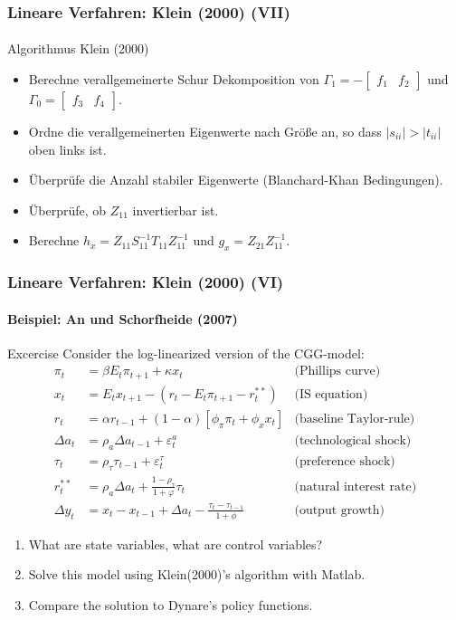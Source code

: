 \documentclass[10pt]{beamer}  %
\begin{document}
\begin{frame}
\frametitle{Lineare Verfahren: Klein (2000) (VII)}\framesubtitle{}
\begin{block}{Algorithmus Klein (2000)}
\begin{itemize}
  \item Berechne verallgemeinerte Schur Dekomposition von $\Gamma_1=-\begin{bmatrix} f_1 & f_2\end{bmatrix}$ und $\Gamma_0=\begin{bmatrix} f_3 & f_4\end{bmatrix}$.
  \item Ordne die verallgemeinerten Eigenwerte nach Gr\"{o}{\ss}e an, so dass $|s_{ii}|>|t_{ii}|$ oben links ist.
  \item \"{U}berpr\"{u}fe die Anzahl stabiler Eigenwerte (Blanchard-Khan Bedingungen).
  \item \"{U}berpr\"{u}fe, ob $Z_{11}$ invertierbar ist.
  \item Berechne $h_x=Z_{11} S_{11}^{-1} T_{11} Z_{11}^{-1}$ und $g_x=Z_{21} Z_{11}^{-1}$.
\end{itemize}
\end{block}

\end{frame}

\begin{frame}\frametitle{Lineare Verfahren: Klein (2000) (VI)}\framesubtitle{Beispiel: An und Schorfheide (2007)}
\begin{block}{Excercise}
Consider the log-linearized version of the CGG-model:
\begin{align*}
  \pi_{t} &=\beta E_{t}\pi _{t+1}+\kappa x_{t} &\text{(Phillips curve)} \\
x_{t} &= E_{t}x_{t+1}-\left( r_{t}-E_{t}\pi _{t+1}-r_{t}^{**}\right) &\text{(IS equation)} \\
r_{t} &=\alpha r_{t-1}+(1-\alpha )\left[ \phi _{\pi }\pi _{t}+\phi _{x}x_{t}\right] &\text{(baseline Taylor-rule)} \\
\Delta a_t &= \rho_a \Delta a_{t-1} + \varepsilon_{t}^a &\text{(technological shock)}\\
\tau_t &= \rho_\tau \tau_{t-1} + \varepsilon_{t}^\tau &\text{(preference shock)}\\
r_{t}^{**} &= \rho_a \Delta a_{t}+\frac{1-\rho_\tau}{1+\varphi } \tau_t &\text{(natural interest rate)} \\
\Delta y_t &= x_{t} - x_{t-1} + \Delta a_t - \frac{\tau_t - \tau_{t-1}}{1+\phi} &\text{(output growth)}
\end{align*}
\begin{enumerate}
  \item What are state variables, what are control variables?
  \item Solve this model using Klein(2000)'s algorithm with Matlab.
  \item Compare the solution to Dynare's policy functions.
\end{enumerate}
\end{block}
\end{frame}
\end{document}

